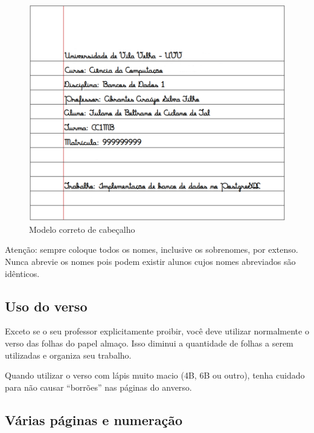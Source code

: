 \begin{figure}[H]
\centering
\caption{Modelo correto de cabeçalho}
\label{fig:cabecalho}
\vspace{-0.3cm}
\includegraphics[scale=0.36]{imagens/cabecalho2.png}
\end{figure}

Atenção: sempre coloque todos os nomes, inclusive os sobrenomes, por
extenso. Nunca abrevie os nomes pois podem existir alunos cujos nomes abreviados
são idênticos.


\subsection{Uso do verso}
\label{sec:como-verso}

Exceto se o seu professor explicitamente proibir, você deve utilizar normalmente
o verso das folhas do papel almaço. Isso diminui a quantidade de folhas a serem
utilizadas e organiza seu trabalho.

Quando utilizar o verso com lápis muito macio (4B, 6B ou outro), tenha cuidado
para não causar ``borrões'' nas páginas do anverso.



\subsection{Várias páginas e numeração}
\label{sec:como-varias}

